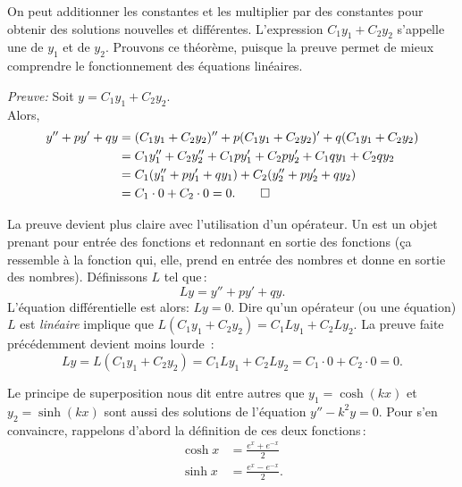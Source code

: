 On peut additionner les constantes et les multiplier par des constantes pour obtenir des solutions nouvelles et différentes.  L'expression $C_1 y_1 + C_2 y_2$ s'appelle une
\emph{} de $y_1$ et de $y_2$.
Prouvons ce théorème, puisque la preuve permet de mieux comprendre le fonctionnement des équations linéaires.

\medskip

\emph{Preuve:}
Soit 
$y = C_1 y_1 + C_2 y_2$. \\
Alors,
\begin{equation*}
\begin{split}
y'' + py' + qy & =
(C_1 y_1 + C_2 y_2)'' + p(C_1 y_1 + C_2 y_2)' + q(C_1 y_1 + C_2 y_2) \\
& = C_1 y_1'' + C_2 y_2'' + C_1 p y_1' + C_2 p y_2' + C_1 q y_1 + C_2 q y_2 \\
& = C_1 ( y_1'' + p y_1' + q y_1 ) + C_2 ( y_2'' + p y_2' + q y_2 ) \\
& = C_1 \cdot 0 + C_2 \cdot 0 = 0 . \qed
\end{split}
\end{equation*}

\medskip

La preuve devient plus claire avec l'utilisation d'un opérateur.
Un \emph{} est un objet prenant pour entrée des fonctions et redonnant en sortie des fonctions (ça ressemble à la fonction qui, elle, prend en entrée des nombres et donne en sortie des nombres).
Définissons $L$ tel que\,: 
\begin{equation*}
Ly = y'' + py' + qy .
\end{equation*}
L'équation différentielle est alors: $Ly=0$.
Dire qu'un opérateur (ou une équation)
$L$ est  \emph{linéaire} implique que $L(C_1y_1 + C_2y_2) = 
C_1 Ly_1 + C_2 Ly_2$.  La preuve faite précédemment devient moins lourde \,:
\begin{equation*}
Ly = L(C_1y_1 + C_2y_2) = 
C_1 Ly_1 + C_2 Ly_2 = C_1 \cdot 0 + C_2 \cdot 0 = 0 .
\end{equation*}

\medskip

Le principe de superposition nous dit entre autres que $y_1 = \cosh (kx)$ et $y_2 = \sinh (kx)$ sont aussi des solutions de l'équation $y'' - k^2y = 0$.  Pour s'en convaincre, rappelons d'abord la définition de ces deux fonctions\,:
\begin{align*}
\cosh x & = \frac{e^x  + e^{-x}}{2} \\
\sinh x  & = \frac{e^x - e^{-x}}{2}.
\end{align*}

